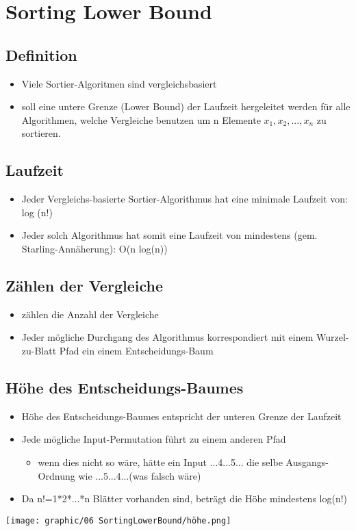 \section{Sorting Lower Bound}

\subsection{Definition}
\begin{itemize}
    \item Viele Sortier-Algoritmen sind vergleichsbasiert
    \item soll eine untere Grenze (Lower Bound) der Laufzeit hergeleitet werden für alle Algorithmen, welche Vergleiche benutzen um n Elemente $x_1, x_2, ..., x_n$ zu sortieren.
\end{itemize}

\subsection{Laufzeit}
\begin{itemize}
    \item Jeder Vergleichs-basierte Sortier-Algorithmus hat eine minimale Laufzeit von: log (n!)
    \item Jeder solch Algorithmus hat somit eine Laufzeit von
    mindestens (gem. Starling-Annäherung): O(n log(n))
\end{itemize}

\subsection{Zählen der Vergleiche}
\begin{itemize}
    \item zählen die Anzahl der Vergleiche
    \item Jeder mögliche Durchgang des Algorithmus korrespondiert mit einem Wurzel-zu-Blatt Pfad ein einem Entscheidungs-Baum
\end{itemize}


\subsection{Höhe des Entscheidungs-Baumes}
\begin{itemize}
    \item Höhe des Entscheidungs-Baumes entspricht der unteren Grenze der Laufzeit
    \item Jede mögliche Input-Permutation führt zu einem anderen Pfad
    \begin{itemize}
        \item wenn dies nicht so wäre, hätte ein Input ...4...5... die selbe Ausgangs-Ordnung wie ...5...4...(was falsch wäre)
    \end{itemize}
    \item Da n!=1*2*...*n Blätter vorhanden sind, beträgt die Höhe mindestens log(n!)
\end{itemize}
\vspace{-8pt}
\begin{center}
    \texttt{[image: graphic/06 SortingLowerBound/höhe.png]}
\end{center}
\vspace{-8pt}

\newpage